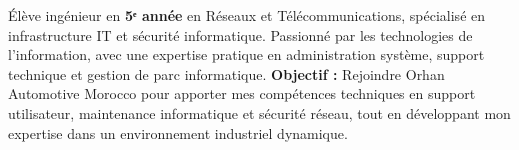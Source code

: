 
\begin{cvparagraph}

  Élève ingénieur en \textbf{5ᵉ année} en Réseaux et Télécommunications, spécialisé en infrastructure IT et sécurité informatique. Passionné par les technologies de l'information, avec une expertise pratique en administration système, support technique et gestion de parc informatique.
  \newline
  \textbf{Objectif :} Rejoindre Orhan Automotive Morocco pour apporter mes compétences techniques en support utilisateur, maintenance informatique et sécurité réseau, tout en développant mon expertise dans un environnement industriel dynamique.

\end{cvparagraph}